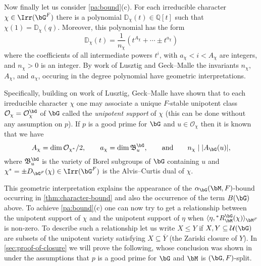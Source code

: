\documentclass[eqthmnum,nocolour,skinny]{jt-calcs}
\begin{document}
\begin{pa}
Now finally let us consider \ref{pa:bound}(c). For each irreducible character $\chi \in \Irr(\bG^F)$ there is a polynomial $\mathbb{D}_{\chi}(t) \in \mathbb{Q}[t]$ such that $\chi(1) = \mathbb{D}_{\chi}(q)$. Moreover, this polynomial has the form
\begin{equation*}
\mathbb{D}_{\chi}(t) = \frac{1}{n_{\chi}}(t^{A_{\chi}} + \cdots \pm t^{a_{\chi}})
\end{equation*}
where the coefficients of all intermediate powers $t^i$, with $a_{\chi} < i < A_{\chi}$ are integers, and $n_{\chi} > 0$ is an integer. By work of Lusztig \cite{lusztig:1992:a-unipotent-support} and Geck--Malle \cite{geck-malle:2000:existence-of-a-unipotent-support} the invariants $n_{\chi}$, $A_{\chi}$, and $a_{\chi}$, occuring in the degree polynomial have geometric interpretations.
\end{pa}

\begin{pa}
Specifically, building on work of Lusztig, Geck--Malle have shown that to each irreducible character $\chi$ one may associate a unique $F$-stable unipotent class $\mathcal{O}_{\chi} = \mathcal{O}_{\chi}^{\bG}$ of $\bG$ called the \emph{unipotent support} of $\chi$ (this can be done without any assumption on $p$). If $p$ is a good prime for $\bG$ and $u \in \mathcal{O}_{\chi}$ then it is known that we have
\begin{equation*}
A_{\chi} = \dim \mathcal{O}_{\chi^*}/2, \qquad a_{\chi} = \dim \mathfrak{B}_u^{\bG},\qquad\text{and}\qquad n_{\chi} \mid |A_{\bG}(u)|,
\end{equation*}
where $\mathfrak{B}_u^{\bG}$ is the variety of Borel subgroups of $\bG$ containing $u$ and $\chi^* = \pm D_{\bG^F}(\chi) \in \Irr(\bG^F)$ is the Alvis--Curtis dual of $\chi$.
\end{pa}

\begin{pa}
This geometric interpretation explains the appearance of the $\alpha_{\bG}(\bM,F)$-bound occurring in \cref{thm:character-bound} and also the occurrence of the term $B(\bG)$ above. To achieve \ref{pa:bound}(c) one can now try to get a relationship between the unipotent support of $\chi$ and the unipotent support of $\eta$ when $\langle \eta, {}^*R_{\bM}^{\bG}(\chi)\rangle_{\bM^F}$ is non-zero. To describe such a relationship let us write $X \leqslant Y$ if $X,Y \subseteq \mathcal{U}(\bG)$ are subsets of the unipotent variety satisfying $X \subseteq \overline{Y}$ (the Zariski closure of $Y$). In \cref{sec:proof-of-closure} we will prove the following, whose conclusion was shown in \cite{bezrukavnikov-liebeck-shalev-tiep:2017:character-bounds-grps-Lie-type} under the assumptions that $p$ is a good prime for $\bG$ and $\bM$ is $(\bG,F)$-split.
\end{pa}
\end{document}
